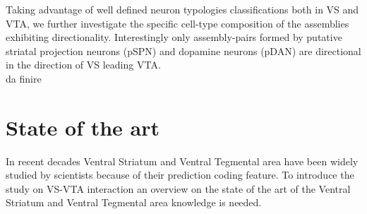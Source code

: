 Taking advantage of well defined neuron typologies classifications both in VS and VTA, we further investigate the specific cell-type composition of the assemblies exhibiting directionality. Interestingly only assembly-pairs formed by putative striatal projection neurons (pSPN) and dopamine neurons (pDAN) are directional in the direction of VS leading VTA.\\
{\color{red}da finire}
\section{State of the art}
\label{sec:StateArt}
 In recent decades Ventral Striatum and Ventral Tegmental area have been widely studied by scientists because of their prediction coding feature.
 To introduce the study on VS-VTA interaction an overview on the state of the art of the Ventral Striatum and Ventral Tegmental area knowledge is needed.
